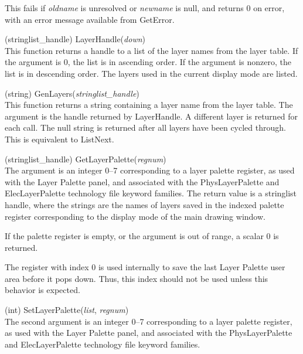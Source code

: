 \begin{description}
This fails if {\it oldname} is unresolved or {\it newname} is null,
and returns 0 on error, with an error message available from {\vt
GetError}.

\item{(stringlist\_handle) \vt LayerHandle({\it down\/})}\\
This function returns a handle to a list of the layer names from the
layer table.  If the argument is 0, the list is in ascending order. 
If the argument is nonzero, the list is in descending order.  The
layers used in the current display mode are listed.

\item{(string) \vt GenLayers({\it stringlist\_handle\/})}\\
This function returns a string containing a layer name from the layer
table.  The argument is the handle returned by {\vt LayerHandle}.  A
different layer is returned for each call.  The null string is
returned after all layers have been cycled through.  This is
equivalent to {\vt ListNext}.

\item{(stringlist\_handle) \vt GetLayerPalette({\it regnum})}\\
The argument is an integer 0--7 corresponding to a layer palette
register, as used with the {\cb Layer Palette} panel, and associated
with the {\vt PhysLayerPalette} and {\vt ElecLayerPalette} technology
file keyword families.  The return value is a stringlist handle, where
the strings are the names of layers saved in the indexed palette
register corresponding to the display mode of the main drawing window.

If the palette register is empty, or the argument is out of range, a
scalar 0 is returned.

The register with index 0 is used internally to save the last {\cb
Layer Palette} user area before it pops down.  Thus, this index should
not be used unless this behavior is expected.

\item{(int) \vt SetLayerPalette({\it list\/}, {\it regnum\/})}\\
The second argument is an integer 0--7 corresponding to a layer
palette register, as used with the {\cb Layer Palette} panel, and
associated with the {\vt PhysLayerPalette} and {\vt ElecLayerPalette}
technology file keyword families.


\end{description}
